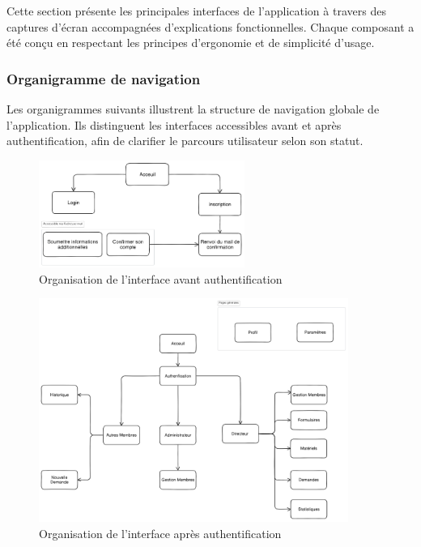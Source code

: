 Cette section présente les principales interfaces de l’application à travers des captures d’écran accompagnées d’explications fonctionnelles. Chaque composant a été conçu en respectant les principes d’ergonomie et de simplicité d’usage.

\subsubsection{Organigramme de navigation}

Les organigrammes suivants illustrent la structure de navigation globale de l’application. Ils distinguent les interfaces accessibles avant et après authentification, afin de clarifier le parcours utilisateur selon son statut.

\begin{figure}[H]
    \centering
    \includegraphics[width=0.6\textwidth]{images/interface/organigramme_interface_auth.png}
    \caption{Organisation de l’interface avant authentification}
    \label{fig:organigramme_non_auth}
\end{figure}

\begin{figure}[H]
    \centering
    \includegraphics[width=0.9\textwidth]{images/interface/organisation_interface.png}
    \caption{Organisation de l’interface après authentification}
    \label{fig:organigramme_auth}
\end{figure}

